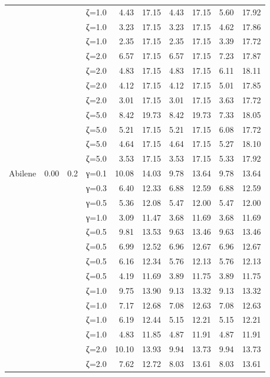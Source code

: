 \begin{table}[htbp]
\begin{tabular}{ll r l  rr  rr  rr}
  &  &  & ζ=1.0 & 4.43 & 17.15 & 4.43 & 17.15 & 5.60 & 17.92 \\
  &  &  & ζ=1.0 & 3.23 & 17.15 & 3.23 & 17.15 & 4.62 & 17.86 \\
  &  &  & ζ=1.0 & 2.35 & 17.15 & 2.35 & 17.15 & 3.39 & 17.72 \\
  &  &  & ζ=2.0 & 6.57 & 17.15 & 6.57 & 17.15 & 7.23 & 17.87 \\
  &  &  & ζ=2.0 & 4.83 & 17.15 & 4.83 & 17.15 & 6.11 & 18.11 \\
  &  &  & ζ=2.0 & 4.12 & 17.15 & 4.12 & 17.15 & 5.01 & 17.85 \\
  &  &  & ζ=2.0 & 3.01 & 17.15 & 3.01 & 17.15 & 3.63 & 17.72 \\
  &  &  & ζ=5.0 & 8.42 & 19.73 & 8.42 & 19.73 & 7.33 & 18.05 \\
  &  &  & ζ=5.0 & 5.21 & 17.15 & 5.21 & 17.15 & 6.08 & 17.72 \\
  &  &  & ζ=5.0 & 4.64 & 17.15 & 4.64 & 17.15 & 5.27 & 18.10 \\
  &  &  & ζ=5.0 & 3.53 & 17.15 & 3.53 & 17.15 & 5.33 & 17.92 \\
\midrule
 Abilene & 0.00 & 0.2 & γ=0.1 & 10.08 & 14.03 & 9.78 & 13.64 & 9.78 & 13.64 \\
  &  &  & γ=0.3 & 6.40 & 12.33 & 6.88 & 12.59 & 6.88 & 12.59 \\
  &  &  & γ=0.5 & 5.36 & 12.08 & 5.47 & 12.00 & 5.47 & 12.00 \\
  &  &  & γ=1.0 & 3.09 & 11.47 & 3.68 & 11.69 & 3.68 & 11.69 \\
  &  &  & ζ=0.5 & 9.81 & 13.53 & 9.63 & 13.46 & 9.63 & 13.46 \\
  &  &  & ζ=0.5 & 6.99 & 12.52 & 6.96 & 12.67 & 6.96 & 12.67 \\
  &  &  & ζ=0.5 & 6.16 & 12.34 & 5.76 & 12.13 & 5.76 & 12.13 \\
  &  &  & ζ=0.5 & 4.19 & 11.69 & 3.89 & 11.75 & 3.89 & 11.75 \\
  &  &  & ζ=1.0 & 9.75 & 13.90 & 9.13 & 13.32 & 9.13 & 13.32 \\
  &  &  & ζ=1.0 & 7.17 & 12.68 & 7.08 & 12.63 & 7.08 & 12.63 \\
  &  &  & ζ=1.0 & 6.19 & 12.44 & 5.15 & 12.21 & 5.15 & 12.21 \\
  &  &  & ζ=1.0 & 4.83 & 11.85 & 4.87 & 11.91 & 4.87 & 11.91 \\
  &  &  & ζ=2.0 & 10.10 & 13.93 & 9.94 & 13.73 & 9.94 & 13.73 \\
  &  &  & ζ=2.0 & 7.62 & 12.72 & 8.03 & 13.61 & 8.03 & 13.61 \\

\end{tabular}
\end{table}
